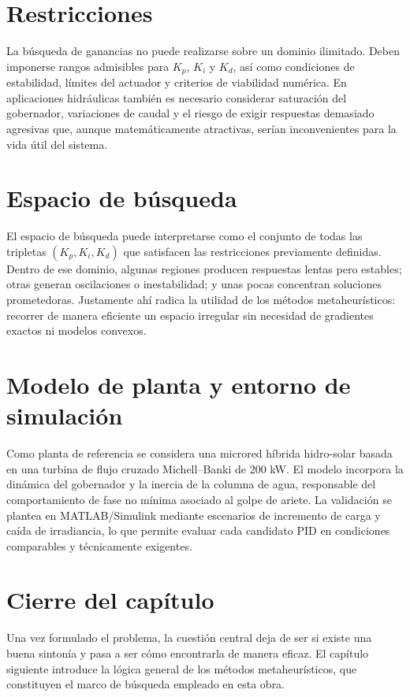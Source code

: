 \section{Restricciones}
La búsqueda de ganancias no puede realizarse sobre un dominio ilimitado. Deben imponerse
rangos admisibles para $K_p$, $K_i$ y $K_d$, así como condiciones de estabilidad, límites del
actuador y criterios de viabilidad numérica. En aplicaciones hidráulicas también es necesario
considerar saturación del gobernador, variaciones de caudal y el riesgo de exigir respuestas
demasiado agresivas que, aunque matemáticamente atractivas, serían inconvenientes para la
vida útil del sistema.

\section{Espacio de búsqueda}
El espacio de búsqueda puede interpretarse como el conjunto de todas las tripletas
$(K_p,K_i,K_d)$ que satisfacen las restricciones previamente definidas. Dentro de ese dominio,
algunas regiones producen respuestas lentas pero estables; otras generan oscilaciones o
inestabilidad; y unas pocas concentran soluciones prometedoras. Justamente ahí radica la
utilidad de los métodos metaheurísticos: recorrer de manera eficiente un espacio irregular sin
necesidad de gradientes exactos ni modelos convexos.

\section{Modelo de planta y entorno de simulación}
Como planta de referencia se considera una microred híbrida hidro-solar basada en una turbina
de flujo cruzado Michell--Banki de 200 kW. El modelo incorpora la dinámica del gobernador y
la inercia de la columna de agua, responsable del comportamiento de fase no mínima asociado
al golpe de ariete. La validación se plantea en MATLAB/Simulink mediante escenarios de
incremento de carga y caída de irradiancia, lo que permite evaluar cada candidato PID en
condiciones comparables y técnicamente exigentes.

\section{Cierre del capítulo}
Una vez formulado el problema, la cuestión central deja de ser si existe una buena sintonía y
pasa a ser cómo encontrarla de manera eficaz. El capítulo siguiente introduce la lógica general
de los métodos metaheurísticos, que constituyen el marco de búsqueda empleado en esta obra.
